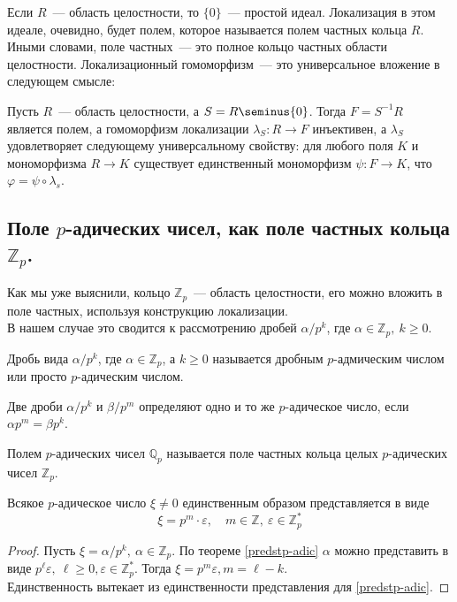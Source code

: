 \documentclass[11pt]{article}
\begin{document}
    Если $R$~--- область целостности, то $\{ 0 \}$~--- простой идеал. Локализация в этом идеале, очевидно,
    будет полем, которое называется полем частных кольца $R$.\\

    Иными словами, поле частных~--- это полное кольцо частных области целостности. Локализационный гомоморфизм~--- это
    универсальное вложение в следующем смысле:

    \begin{lemma}
        Пусть $R$~--- область целостности, а $S = R\seminus \{ 0 \}$. Тогда $F = S^{-1}R$ является полем, а гомоморфизм
        локализации $\lambda_{S}\colon R \to F$ инъективен, а $\lambda_{S}$ удовлетворяет следующему универсальному свойству:
        для любого поля $K$ и мономорфизма $R \to K$ существует единственный мономорфизм $\psi\colon F \to K$, что $\varphi = \psi \circ \lambda_s$.
    \end{lemma}

    \subsection{Поле $p$-адических чисел, как поле частных кольца $\mathbb{Z}_p$.}

    Как мы уже выяснили, кольцо $\mathbb{Z}_p$~--- область целостности, его можно вложить в поле частных, используя
    конструкцию локализации.\\
    В нашем случае это сводится к рассмотрению дробей $\alpha / p^k$, где $\alpha \in \mathbb{Z}_p, \ k \ge 0$.
    \begin{definition}
        Дробь вида $\alpha / p^k$, где $\alpha \in \mathbb{Z}_p$, а $k \ge 0$ называется дробным $p$-адмическим числом
        или просто $p$-адическим числом.
    \end{definition}
    \begin{remark}
         Две дроби $\alpha / p^k$ и $\beta / p^m$ определяют одно и то же $p$-адическое число, если $\alpha p^m = \beta p^k$.
    \end{remark}

    \begin{definition}
        Полем  $p$-адических чисел $\mathbb{Q}_p$ называется поле частных кольца целых $p$-адических чисел $\mathbb{Z}_p$.
    \end{definition}

    \begin{theorem}
        Всякое $p$-адическое число $\xi \neq 0$ единственным образом представляется в виде
        \[ \xi = p^m \cdot \varepsilon, \quad m \in \mathbb{Z}, \ \varepsilon \in \mathbb{Z}_p^{*} \]
    \end{theorem}
    \begin{proof}
        Пусть $\xi = \alpha / p^k, \ \alpha \in \mathbb{Z}_p$. По теореме \ref{predstp-adic}  $\alpha$ можно представить в виде
        $p^{\ell} \varepsilon, \ \ell \ge 0, \varepsilon \in \mathbb{Z}_p^{*}$. Тогда $\xi = p^m \varepsilon, m = \ell - k$.\\
        Единственность вытекает из единственности представления для \ref{predstp-adic}.
    \end{proof}
\end{document}
